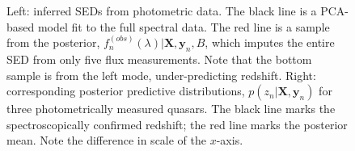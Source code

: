 \documentclass{article} %
\begin{document}
\begin{figure}[t]
{}
\vskip -0.2in
\caption{Left: inferred SEDs from photometric data.  
The black line is a PCA-based model fit to the full spectral data.  
The red line is a sample from the posterior, $f^{(obs)}_n(\lambda) | \mathbf{X}, \mathbf{y}_n, B$, which imputes the entire SED from only five flux measurements.  
Note that the bottom sample is from the left mode, under-predicting redshift.   
Right: corresponding posterior predictive distributions, $p(z_n | \mathbf{X}, \mathbf{y}_n)$ for three photometrically measured quasars. 
The black line marks the spectroscopically confirmed redshift; the red line marks the posterior mean. Note the difference in scale of the $x$-axis.}
\label{fig:recon}
\vskip -0.1in
\end{figure}

\end{document}
